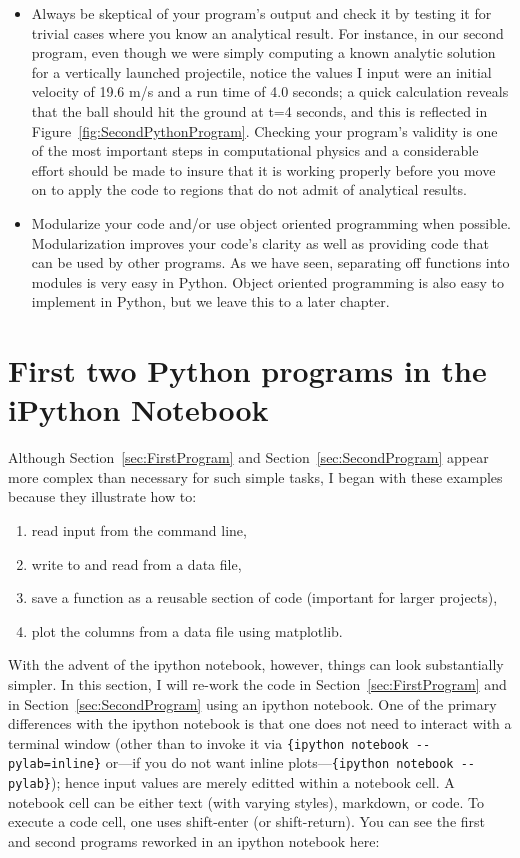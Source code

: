 \begin{itemize}
	\item Always be skeptical of your program's output and check it by testing it for trivial cases where you know an analytical result. For instance, in our second program, even though we were simply computing a known analytic solution for a vertically launched projectile, notice the values I input were an initial velocity of 19.6 m/s and a run time of 4.0 seconds; a quick calculation reveals that the ball should hit the ground at t=4 seconds, and this is reflected in Figure~\ref{fig:SecondPythonProgram}. Checking your program's validity is one of the most important steps in computational physics and a considerable effort should be made to insure that it is working properly before you move on to apply the code to regions that do not admit of analytical results. 
	
	\item Modularize your code and/or use object oriented programming when possible. Modularization improves your code's clarity as well as providing code that can be used by other programs. As we have seen, separating off functions into modules is very easy in Python. Object oriented programming is also easy to implement in Python, but we leave this to a later chapter. 	

\end{itemize}

\section{First two Python programs in the iPython Notebook}
\label{sec:ipythonVersion}
Although Section~\ref{sec:FirstProgram} and Section~\ref{sec:SecondProgram} appear more complex than necessary for such simple tasks, I began with these examples because they illustrate how to:
\begin{enumerate}
	\item read input from the command line,
	\item write to and read from a data file,
	\item save a function as a reusable section of code (important for larger projects),
	\item plot the columns from a data file using matplotlib.	
\end{enumerate}	
With the advent of the ipython notebook, however, things can look substantially simpler. In this section, I will re-work the code in Section~\ref{sec:FirstProgram} and in Section~\ref{sec:SecondProgram} using an ipython notebook. One of the primary differences with the ipython notebook is that one does not need to interact with a terminal window (other than to invoke it via \verb!{ipython notebook --pylab=inline}! or---if you do not want inline plots---\verb!{ipython notebook --pylab}!); hence input values are merely editted within a notebook cell. A notebook cell can be either text (with varying styles), markdown, or code. To execute a code cell, one uses shift-enter (or shift-return). You can see the first and second programs reworked in an ipython notebook here: 



